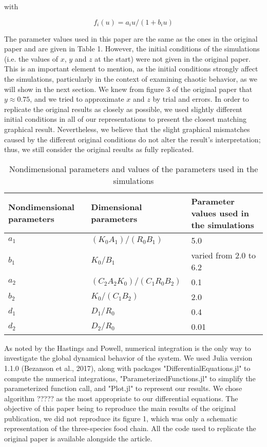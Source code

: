 \documentclass[12pt]{article}
\begin{document}
with

$$
f_i(u) = a_iu/(1 + b_iu)
$$

The parameter values used in this paper are the same as the ones in the original paper and are given in Table 1. However, the initial conditions of the simulations (i.e. the values of $x$, $y$ and $z$ at the start) were not given in the original paper. This is an important element to mention, as the initial conditions strongly affect the simulations, particularly in the context of examining chaotic behavior, as we will show in the next section. We knew from figure 3 of the original paper that $y \approx 0.75$, and we tried to approximate $x$ and $z$ by trial and errors. In order to replicate the original results as closely as possible, we used slightly different initial conditions in all of our representations to present the closest matching graphical result. Nevertheless, we believe that the slight graphical mismatches caused by the different original conditions do not alter the result's interpretation; thus, we still consider the original results as fully replicated.

\begin{table}[!htb]
\centering
\caption{Nondimensional parameters and values of the parameters used in the simulations}
\begin{tabular}{lll}
  \hline
  Nondimensional parameters & Dimensional parameters & Parameter values used in the simulations \\
  \hline
  $a_1$ & $(K_0A_1)/(R_0B_1)$ & 5.0 \\
  $b_1$ & $K_0/B_1$ & varied from 2.0 to 6.2 \\
  $a_2$ & $(C_2A_2K_0)/(C_1R_0B_2)$ & 0.1 \\
  $b_2$ & $K_0/(C_1B_2)$ & 2.0 \\
  $d_1$ & $D_1/R_0$ & 0.4 \\
  $d_2$ & $D_2/R_0$ & 0.01 \\
   \hline
\end{tabular}
\end{table}

As noted by the Hastings and Powell, numerical integration is the only way to investigate the global dynamical behavior of the system. We used Julia version 1.1.0 (Bezanson et al., 2017), along with packages "DifferentialEquations.jl" to compute the numerical integrations, "ParameterizedFunctions.jl" to simplify the parameterized function call, and "Plot.jl" to represent our results. We chose algorithm ????? as the most appropriate to our differential equations. The objective of this paper being to reproduce the main results of the original publication, we did not reproduce its figure 1, which was only a schematic representation of the three-species food chain. All the code used to replicate the original paper is available alongside the article.
\end{document}
